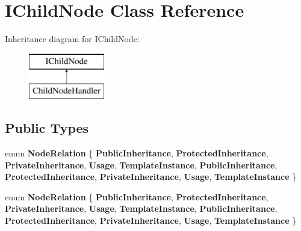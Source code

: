\hypertarget{class_i_child_node}{}\section{I\+Child\+Node Class Reference}
\label{class_i_child_node}
Inheritance diagram for I\+Child\+Node\+:\begin{figure}[H]
\begin{center}
\leavevmode
\includegraphics[height=2.000000cm]{class_i_child_node}
\end{center}
\end{figure}
\subsection*{Public Types}
\begin{DoxyCompactItemize}
\item 
\mbox{\label{class_i_child_node_a8f1206e7dd6aba7e62a7e50e2edf8ee2}} 
enum {\bfseries Node\+Relation} \{ \newline
{\bfseries Public\+Inheritance}, 
{\bfseries Protected\+Inheritance}, 
{\bfseries Private\+Inheritance}, 
{\bfseries Usage}, 
\newline
{\bfseries Template\+Instance}, 
{\bfseries Public\+Inheritance}, 
{\bfseries Protected\+Inheritance}, 
{\bfseries Private\+Inheritance}, 
\newline
{\bfseries Usage}, 
{\bfseries Template\+Instance}
 \}
\item 
\mbox{\label{class_i_child_node_a8f1206e7dd6aba7e62a7e50e2edf8ee2}} 
enum {\bfseries Node\+Relation} \{ \newline
{\bfseries Public\+Inheritance}, 
{\bfseries Protected\+Inheritance}, 
{\bfseries Private\+Inheritance}, 
{\bfseries Usage}, 
\newline
{\bfseries Template\+Instance}, 
{\bfseries Public\+Inheritance}, 
{\bfseries Protected\+Inheritance}, 
{\bfseries Private\+Inheritance}, 
\newline
{\bfseries Usage}, 
{\bfseries Template\+Instance}
 \}
\end{DoxyCompactItemize}
